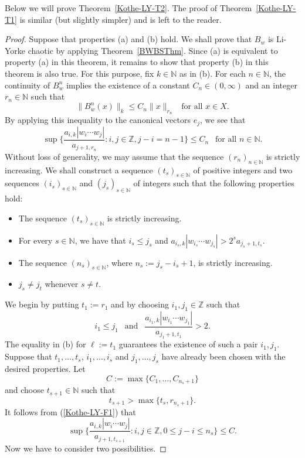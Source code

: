 \documentclass[12pt]{amsart}
\theoremstyle{theorem}
\theoremstyle{definition}
\theoremstyle{remark} \theoremstyle{question} \theoremstyle{example}
\newcommand{\N}{\mathbb{N}}
\newcommand{\Z}{\mathbb{Z}}
\begin{document}
Below we will prove Theorem~\ref{Kothe-LY-T2}. 
The proof of Theorem~\ref{Kothe-LY-T1} is similar (but slightly simpler) and is left to the reader.

\begin{proof}
Suppose that properties (a) and (b) hold. 
We shall prove that $B_w$ is Li-Yorke chaotic by applying Theorem~\ref{BWBSThm}.
Since (a) is equivalent to property (a) in this theorem, it remains to show that property (b) in this theorem is also true.
For this purpose, fix $k \in \N$ as in (b).
For each $n \in \N$, the continuity of $B_w^n$ implies the existence of a constant $C_n \in (0,\infty)$ and an integer $r_n \in \N$ such that
\[
\|B_w^n(x)\|_k \leq C_n \|x\|_{r_n} \ \ \text{ for all } x \in X.
\]
By applying this inequality to the canonical vectors $e_j$, we see that
\begin{equation}\label{Kothe-LY-F1}
\sup\Big\{\frac{a_{i,k} |w_i \cdots w_j|}{a_{j+1,r_n}} : i,j \in \Z, j - i = n-1\Big\} \leq C_n \ \ \text{ for all } n \in \N.
\end{equation}
Without loss of generality, we may assume that the sequence $(r_n)_{n \in \N}$ is strictly increasing.
We shall construct a sequence $(t_s)_{s \in \N}$ of positive integers and two sequences $(i_s)_{s \in \N}$ and $(j_s)_{s \in \N}$
of integers such that the following properties hold:
\begin{itemize}
\item [($\alpha$)] The sequence $(t_s)_{s \in \N}$ is strictly increasing.
\item [($\beta$)] For every $s \in \N$, we have that $i_s \leq j_s$ and $a_{i_s,k} |w_{i_s} \cdots w_{j_s}| > 2^s a_{j_s + 1,t_s}$.
\item [($\gamma$)] The sequence $(n_s)_{s \in \N}$, where $n_s\!:= j_s - i_s + 1$, is strictly increasing.
\item [($\delta$)] $j_s \neq j_t$ whenever $s \neq t$.
\end{itemize}
We begin by putting $t_1\!:= r_1$ and by choosing $i_1,j_1 \in \Z$ such that
\[
i_1 \leq j_1 \ \ \text{ and } \ \ \frac{a_{i_1,k} |w_{i_1} \cdots w_{j_1}|}{a_{j_1 + 1,t_1}} > 2.
\]
The equality in (b) for $\ell\!:= t_1$ guarantees the existence of such a pair $i_1,j_1$.
Suppose that $t_1,\ldots,t_s$, $i_1,\ldots,i_s$ and $j_1,\ldots,j_s$ have already been chosen with the desired properties.
Let
\[
C\!:= \max\{C_1,\ldots,C_{n_s+1}\}
\]
and choose $t_{s+1} \in \N$ such that
\[
t_{s+1} > \max\{t_s,r_{n_s + 1}\}.
\]
It follows from (\ref{Kothe-LY-F1}) that
\begin{equation}\label{Kothe-LY-F2}
\sup\Big\{\frac{a_{i,k} |w_i \cdots w_j|}{a_{j+1,t_{s+1}}} : i,j \in \Z, 0 \leq j - i \leq n_s\Big\} \leq C.
\end{equation}
Now we have to consider two possibilities.


\end{proof}
\end{document}
